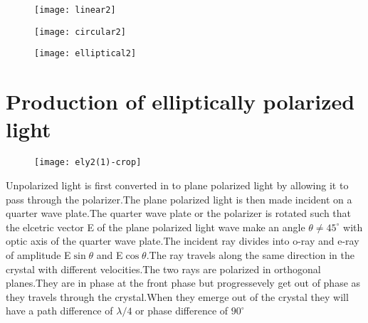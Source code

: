  
\begin{minipage}{0.33\textwidth}
	\begin{figure}[H]
		\begin{center}
			\texttt{[image: linear2]}
		\end{center}
	\end{figure}
\end{minipage}
\begin{minipage}{0.33\textwidth}
	\begin{figure}[H]
		\begin{center}
			\texttt{[image: circular2]}
		\end{center}
	\end{figure}
\end{minipage}
\begin{minipage}{0.33\textwidth}
	\begin{figure}[H]
		\begin{center}
			\texttt{[image: elliptical2]}
		\end{center}
	\end{figure}
\end{minipage}
\section{Production of elliptically polarized light}
\begin{figure}[H]
	\centering
	\texttt{[image: ely2(1)-crop]}
	\caption{}
	\label{}
\end{figure}
Unpolarized light is first converted in to plane polarized light by allowing it to pass through the polarizer.The plane polarized light is then made incident on a quarter wave plate.The quarter wave plate or the polarizer is rotated such that the elcetric vector E 
of the plane polarized light wave make an angle $\theta\neq45^{\circ}$ with optic axis of the quarter wave plate.The incident ray divides into o-ray and e-ray of amplitude E$\sin\theta$ and E$\cos\theta$.The ray travels along the same direction in the crystal with different velocities.The two rays are polarized in orthogonal planes.They are in phase at the front phase but progressevely get out of phase as they travels through the crystal.When they emerge out of the crystal they will have a path difference of $\lambda/4$ or phase difference of $90^{\circ}$
